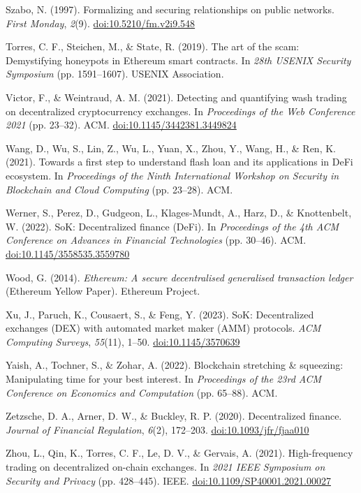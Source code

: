 \begin{enumerate}[label={[\arabic*]}, leftmargin=*, itemsep=0.35em, parsep=0pt]
  \item{}\label{ref:56} Szabo, N. (1997). Formalizing and securing relationships on public networks. \textit{First Monday}, \textit{2}(9). \href{https://doi.org/10.5210/fm.v2i9.548}{doi:10.5210/fm.v2i9.548}
  \item{}\label{ref:57} Torres, C. F., Steichen, M., \& State, R. (2019). The art of the scam: Demystifying honeypots in Ethereum smart contracts. In \textit{28th USENIX Security Symposium} (pp. 1591--1607). USENIX Association.
  \item{}\label{ref:58} Victor, F., \& Weintraud, A. M. (2021). Detecting and quantifying wash trading on decentralized cryptocurrency exchanges. In \textit{Proceedings of the Web Conference 2021} (pp. 23--32). ACM. \href{https://doi.org/10.1145/3442381.3449824}{doi:10.1145/3442381.3449824}
  \item{}\label{ref:59} Wang, D., Wu, S., Lin, Z., Wu, L., Yuan, X., Zhou, Y., Wang, H., \& Ren, K. (2021). Towards a first step to understand flash loan and its applications in DeFi ecosystem. In \textit{Proceedings of the Ninth International Workshop on Security in Blockchain and Cloud Computing} (pp. 23--28). ACM.
  \item{}\label{ref:60} Werner, S., Perez, D., Gudgeon, L., Klages-Mundt, A., Harz, D., \& Knottenbelt, W. (2022). SoK: Decentralized finance (DeFi). In \textit{Proceedings of the 4th ACM Conference on Advances in Financial Technologies} (pp. 30--46). ACM. \href{https://doi.org/10.1145/3558535.3559780}{doi:10.1145/3558535.3559780}
  \item{}\label{ref:61} Wood, G. (2014). \textit{Ethereum: A secure decentralised generalised transaction ledger} (Ethereum Yellow Paper). Ethereum Project.
  \item{}\label{ref:62} Xu, J., Paruch, K., Cousaert, S., \& Feng, Y. (2023). SoK: Decentralized exchanges (DEX) with automated market maker (AMM) protocols. \textit{ACM Computing Surveys}, \textit{55}(11), 1--50. \href{https://doi.org/10.1145/3570639}{doi:10.1145/3570639}
  \item{}\label{ref:63} Yaish, A., Tochner, S., \& Zohar, A. (2022). Blockchain stretching \& squeezing: Manipulating time for your best interest. In \textit{Proceedings of the 23rd ACM Conference on Economics and Computation} (pp. 65--88). ACM.
  \item{}\label{ref:64} Zetzsche, D. A., Arner, D. W., \& Buckley, R. P. (2020). Decentralized finance. \textit{Journal of Financial Regulation}, \textit{6}(2), 172--203. \href{https://doi.org/10.1093/jfr/fjaa010}{doi:10.1093/jfr/fjaa010}
  \item{}\label{ref:65} Zhou, L., Qin, K., Torres, C. F., Le, D. V., \& Gervais, A. (2021). High-frequency trading on decentralized on-chain exchanges. In \textit{2021 IEEE Symposium on Security and Privacy} (pp. 428--445). IEEE. \href{https://doi.org/10.1109/SP40001.2021.00027}{doi:10.1109/SP40001.2021.00027}
\end{enumerate}

